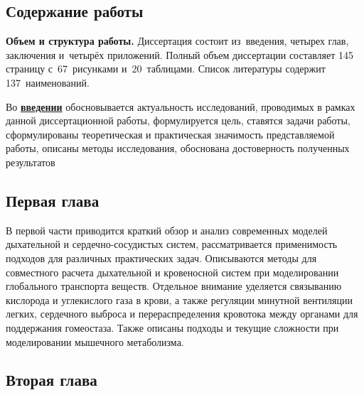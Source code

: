 \subsection*{\Large Содержание работы}

\textbf{Объем и структура работы.} Диссертация состоит из~введения, четырех глав, заключения и~четырёх приложений. Полный объем диссертации составляет 145 страницу с~67~рисунками и~20~таблицами. Список литературы содержит 137~наименований.

Во \underline{\textbf{введении}} обосновывается актуальность исследований, проводимых в рамках данной диссертационной работы,  формулируется цель, ставятся задачи работы, сформулированы теоретическая и практическая значимость представляемой работы, описаны методы исследования, обоснована достоверность полученных результатов 

\subsection*{Первая глава}

В первой части приводится краткий обзор и анализ современных моделей дыхательной и сердечно-сосудистых систем, рассматривается применимость подходов для различных практических задач. Описываются методы для совместного расчета дыхательной и кровеносной систем при моделировании глобального транспорта веществ. Отдельное внимание уделяется связыванию кислорода и углекислого газа в крови, а также регуляции минутной вентиляции легких, сердечного выброса и перераспределения кровотока между органами для поддержания гомеостаза. Также описаны подходы и текущие сложности при моделировании мышечного метаболизма. 
\subsection*{Вторая глава}

